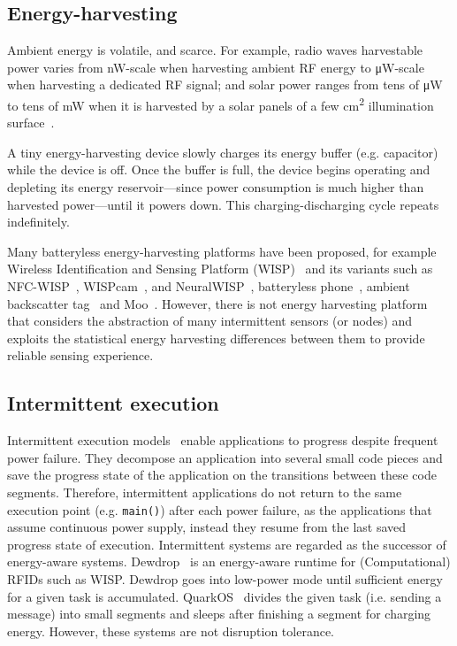 \subsection{Energy-harvesting}

Ambient energy is volatile, and scarce. For example, radio waves harvestable power varies from \si{\nano\watt}-scale when harvesting ambient RF energy to \si{\uW}-scale when harvesting a dedicated RF signal; and solar power ranges from tens of \si{\uW} to tens of \si{\mW} when it is harvested by a solar panels of a few \si{\cm^2} illumination surface~\cite{lucia2017intermittent,rao2017ambient}.%

A tiny energy-harvesting device slowly charges its energy buffer (e.g. capacitor) while the device is off. Once the buffer is full, the device begins operating and depleting its energy reservoir---since power consumption is much higher than harvested power---until it powers down. This charging-discharging cycle repeats indefinitely. 

Many batteryless energy-harvesting platforms have been proposed, for example Wireless Identification and Sensing Platform (WISP)~\cite{smith_ubicomp_2006} and its variants such as NFC-WISP~\cite{zhao2015nfc}, WISPcam~\cite{naderiparizi_rfid_2015}, and NeuralWISP~\cite{yeager2009neuralwisp}, batteryless phone~\cite{talla2017battery}, ambient backscatter tag~\cite{liu2013ambient} and Moo~\cite{moo}. However, there is not energy harvesting platform that considers the abstraction of many intermittent sensors (or nodes) and exploits the statistical energy harvesting differences between them to provide reliable sensing experience. 

\subsection{Intermittent execution}
Intermittent execution models~\cite{van2016intermittent,colin2016chain,lucia2015simpler,bhatti2017harvos} enable applications to progress despite frequent power failure. They decompose an application into several small code pieces and save the progress state of the application on the transitions between these code segments. Therefore, intermittent applications do not return to the same execution point (e.g. \texttt{main()}) after each power failure, as the applications that assume continuous power supply, instead they resume from the last saved progress state of execution.   
Intermittent systems are regarded as the successor of energy-aware systems. Dewdrop~\cite{buettner2011dewdrop} is an energy-aware runtime for (Computational) RFIDs such as WISP. 
Dewdrop goes into low-power mode until sufficient energy for a given task is accumulated. QuarkOS~\cite{zhang2013quarkos} divides the given task (i.e. sending a message) into small segments and sleeps after finishing a segment for charging energy. However, these systems are not disruption tolerance.  

